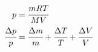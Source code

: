 \begin{align*}
    p &= \cfrac{mRT}{MV}
    \\
    \cfrac{\Delta p}{p} &= \cfrac{\Delta m}{m} + \cfrac{\Delta T}{T} + \cfrac{\Delta V}{V}
\end{align*}
